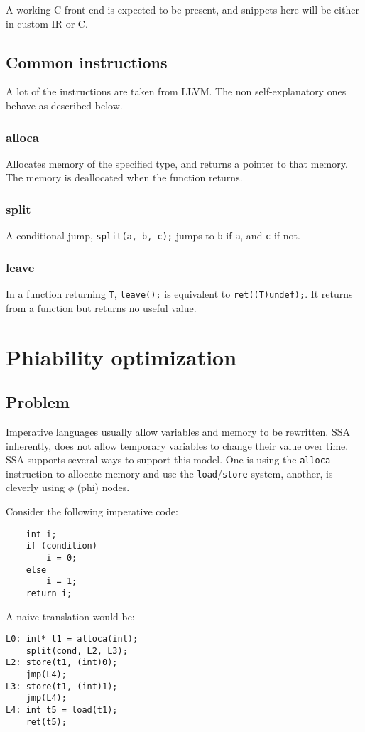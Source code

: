 \documentclass[12pt, a4paper]{article}
\begin{document}
A working C front-end is expected to be present, and snippets here will be 
either in custom IR or C.

\subsection{Common instructions}
A lot of the instructions are taken from LLVM. The non self-explanatory ones
behave as described below.
\subsubsection{alloca}
Allocates memory of the specified type, and returns a pointer to that memory.
The memory is deallocated when the function returns.
\subsubsection{split}
A conditional jump, \verb+split(a, b, c);+ jumps to \verb+b+ if \verb+a+, and
\verb+c+ if not.
\subsubsection{leave}
In a function returning \verb+T+, \verb+leave();+ is equivalent to
\verb+ret((T)undef);+. It returns from a function but returns no useful value.

  \section{Phiability optimization}
  \subsection{Problem}
Imperative languages usually allow variables and memory to be rewritten. SSA 
inherently, does not allow temporary variables to change their value over time. 
SSA supports several ways to support this model. One is using the \verb+alloca+
instruction to allocate memory and use the \verb+load+/\verb+store+ system,
another, is cleverly using $\phi$ (phi) nodes.

Consider the following imperative code:

\begin{lstlisting}
	int i;
	if (condition)
		i = 0;
	else
		i = 1;
	return i;
\end{lstlisting}

A naive translation would be:

\begin{lstlisting}
L0:	int* t1 = alloca(int);
	split(cond, L2, L3);
L2:	store(t1, (int)0);
	jmp(L4);
L3:	store(t1, (int)1);
	jmp(L4);
L4:	int t5 = load(t1);
	ret(t5);
\end{lstlisting}
\end{document}
